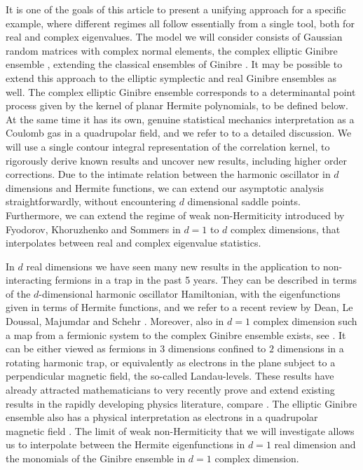 \documentclass[%
 jmp,
cp,  %
 amsmath,amsthm,amssymb,%
 reprint,%
onecolumn]{revtex4-2}
\begin{document}
It is one of the goals of this article to present a unifying approach for a specific example, where different regimes all follow essentially from a single tool, both for real and complex eigenvalues.  The model we will consider consists of Gaussian random matrices with complex normal elements, the complex elliptic Ginibre ensemble \cite{Girko,SCSS}, extending the classical ensembles of Ginibre \cite{Ginibre}. It may be possible to extend this approach to the elliptic symplectic and real Ginibre ensembles as well.
The complex elliptic Ginibre ensemble corresponds to a determinantal point process given by the 
 kernel of planar Hermite polynomials, to be defined below. At the same time it has its own, genuine statistical mechanics interpretation as a Coulomb gas in a quadrupolar field, and we refer to \cite{Peter} to a detailed discussion. 
We will use a single contour integral representation of the correlation kernel, to rigorously derive known results and uncover new results, including higher order corrections. Due to the intimate relation between the harmonic oscillator in $d$ dimensions and Hermite functions, we can extend our asymptotic analysis straightforwardly,  without encountering $d$ dimensional saddle points.
Furthermore, we can extend the regime of weak non-Hermiticity introduced by Fyodorov, Khoruzhenko and Sommers in $d=1$ \cite{FyKhSo1,FyKhSo2} to $d$ complex dimensions, that interpolates between real and complex eigenvalue statistics. 

In $d$ real dimensions we have seen many new results in the application to non-interacting fermions in a trap in the past 5 years. They can be described in terms of the $d$-dimensional harmonic oscillator Hamiltonian, with the eigenfunctions given in terms of Hermite functions, and we refer to a recent review by Dean, Le Doussal, Majumdar and Schehr \cite{DeDoMaSc3}. Moreover, also in $d = 1$ complex dimension such a map from a fermionic system to the complex Ginibre ensemble exists, see \cite{BSG}. It can be either viewed as fermions in $3$ dimensions confined to $2$ dimensions in a rotating harmonic trap, or equivalently as electrons in the plane subject to a perpendicular magnetic field, the so-called Landau-levels.  These results have already attracted mathematicians to very recently prove \cite{DeLa,Charlier} and extend existing results in the rapidly developing physics literature, compare \cite{DeDoMaSc3}. The elliptic Ginibre ensemble also has a physical interpretation as electrons in a quadrupolar magnetic field \cite{FoJa}. The limit of weak non-Hermiticity that we will investigate allows us to interpolate between the Hermite eigenfunctions in $d=1$ real dimension and the monomials of the Ginibre ensemble in $d=1$ complex dimension. 
\end{document}
